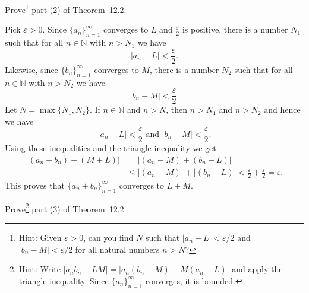 \documentclass[12pt]{amsart}
\def\e{\varepsilon}
\newcommand{\N}{\mathbb{N}}
\numberwithin{equation}{section}
\theoremstyle{plain} %
\theoremstyle{definition}
\theoremstyle{remark}
\def\and{{ \text{ and } }}
\begin{document}
\item Prove\footnote{Hint: Given $\varepsilon>0$, can you find $N$ such that $|a_n-L|<\varepsilon/2$ and $|b_n-M|<\varepsilon/2$ for all natural numbers $n>N$?} part (2) of Theorem~12.2.

\begin{framed}
Pick $\e > 0$. 	
	Since $\{a_n\}_{n=1}^\infty$ converges to $L$ and $\frac{\e}{2}$ is positive, 
	there is a number $N_1$ such that for all $n \in \N$ with $n > N_1$ we have
	$$
	|a_n - L| < \frac{\e}{2}.
	$$
	Likewise, 
	since $\{b_n\}_{n=1}^\infty$ converges to $M$,
	there is a number $N_2$ such that for all $n \in \N$ with $n > N_2$ we have
	$$
	|b_n - M| < \frac{\e}{2}.
	$$
	Let $N = \max\{N_1, N_2\}$. If $n \in \N$ and $n > N$, then $n > N_1$ and $n > N_2$ and hence we have
	$$
	|a_n - L| < \frac{\e}{2}
	\and
	|b_n - M| < \frac{\e}{2}.
	$$
	Using these inequalities and the triangle inequality we get
	$$\begin{aligned}
	|(a_n+b_n) - (M+L)| &= |(a_n-M) + (b_n -L)| \\&\leq |(a_n-M)| + |(b_n -L)| < \frac{\e}{2} + \frac{\e}{2}  = \e.\end{aligned}
	$$
	This proves that $\{a_n  + b_n\}_{n=1}^\infty$ converges to $L + M$.
\end{framed}

\item Prove\footnote{Hint: Write $|a_n b_n - L M| = |a_n(b_n -M) + M(a_n - L)|$ and apply the triangle inequality. Since $\{a_n\}_{n=1}^\infty$ converges, it is bounded.}  part (3) of Theorem~12.2.
\end{document}
